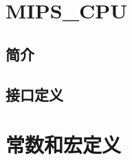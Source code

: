 \documentclass{article}
\begin{document}
\section{MIPS_CPU}
\label{sec:MIPS_CPU}

\subsection{简介}

\subsection{接口定义}

\appendix
\section{常数和宏定义}
\end{document}
